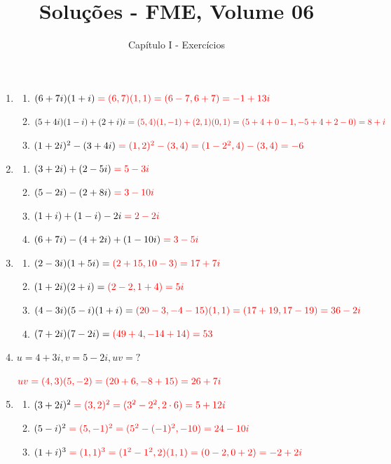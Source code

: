 \documentclass[12pt, openright, a4paper, twoside, english, brazil]{article}
\title{\vspace{-2cm}Soluções - FME, Volume 06}
\author{Capítulo I - Exercícios}
\date{}
\newenvironment{qitem}{
  \color{black}
\item}{\vspace{10pt}}
\newenvironment{qmitem}{
  \color{black}
\item
\begin{enumerate}[\bfseries a)]}{
\end{enumerate}\vspace{10pt}}
\begin{document}
\maketitle

\begin{enumerate}[\bfseries 1.]
  \begin{qmitem} %
  \item $(6+7i)(1+i)\color{red}=(6,7)(1,1) = (6-7, 6+7) = -1+13i$
  \item $(5+4i)(1-i)+(2+i)i\color{red}=(5,4)(1,-1) + (2,1)(0,1) =
    (5+4+0-1, -5+4+2-0) = 8+i$
  \item $(1+2i)^2-(3+4i)\color{red}=(1,2)^2 - (3,4) = (1-2^2, 4) - (3,4) = -6$
  \end{qmitem}

  \begin{qmitem} %
  \item$(3+2i) + (2-5i)\color{red} = 5-3i$
  \item$(5-2i) - (2+8i)\color{red} = 3-10i$
  \item$(1+i) + (1-i) - 2i\color{red} = 2-2i$
  \item$(6+7i) - (4+2i) + (1-10i)\color{red} = 3-5i$
  \end{qmitem}

  \begin{qmitem} %
  \item $(2-3i)(1+5i) =\color{red} (2+15, 10-3) = 17+7i$
  \item $(1+2i)(2+i) =\color{red} (2-2, 1+4) = 5i$
  \item $(4-3i)(5-i)(1+i) =\color{red} (20-3, -4-15)(1,1) = (17+19,
    17-19) = 36-2i$
  \item $(7+2i)(7-2i) =\color{red} (49+4, -14+14) = 53$
  \end{qmitem}

  \begin{qitem} %
    $u=4+3i, v=5-2i, uv=?$

    $\color{red} uv=(4,3)(5,-2) = (20+6, -8+15) = 26+7i$
  \end{qitem}

  \begin{qmitem} %
  \item $(3+2i)^2 \color{red}=(3,2)^2 = (3^2-2^2, 2 \cdot 6) = 5+12i$
  \item $(5-i)^2 \color{red}=(5,-1)^2 = (5^2-(-1)^2, -10) = 24-10i$
  \item $(1+i)^3 \color{red}=(1,1)^3 = (1^2-1^2, 2)(1,1) = (0-2, 0+2) = -2+2i$
  \end{qmitem}


\end{enumerate}
\end{document}
